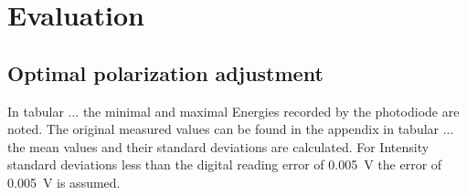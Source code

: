 \section{Evaluation}


\subsection{Optimal polarization adjustment}
In tabular ... the minimal and maximal Energies recorded by the photodiode are
noted. The original measured values can be found in the appendix in tabular ...
the mean values and their standard deviations are calculated. For Intensity
standard deviations less than the digital reading error of \qty{0.005}{\volt}
the error of \qty{0.005}{\volt} is assumed.


